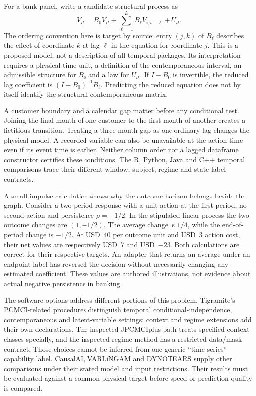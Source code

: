 For a bank panel, write a candidate structural process as
\[
 V_{it}=B_0V_{it}+\sum_{\ell=1}^{L}B_\ell V_{i,t-\ell}+U_{it}.
\]
The ordering convention here is target by source: entry $(j,k)$ of $B_\ell$
describes the effect of coordinate $k$ at lag $\ell$ in the equation for
coordinate $j$. This is a proposed model, not a description of all temporal
packages. Its interpretation requires a physical time unit, a definition of
the contemporaneous interval, an admissible structure for $B_0$ and a law
for $U_{it}$. If $I-B_0$ is invertible, the reduced lag coefficient is
$(I-B_0)^{-1}B_\ell$. Predicting the reduced equation does not by itself
identify the structural contemporaneous matrix.

A customer boundary and a calendar gap matter before any conditional test.
Joining the final month of one customer to the first month of another creates
a fictitious transition. Treating a three-month gap as one ordinary lag
changes the physical model. A recorded variable can also be unavailable at
the action time even if its event time is earlier. Neither column order nor a
lagged dataframe constructor certifies these conditions. The R, Python, Java
and C++ temporal comparisons trace their different window, subject, regime
and state-label contracts. \citep{exec14_pt_contract,exec16_ct_pcalg,exec16_ct_agrum,exec16_ct_sdbn}

A small impulse calculation shows why the outcome horizon belongs beside the
graph. Consider a two-period response with a unit action at the first period,
no second action and persistence $\rho=-1/2$. In the stipulated linear process
the two outcome changes are $(1,-1/2)$. The average change is $1/4$, while
the end-of-period change is $-1/2$. At USD~40 per outcome unit and USD~3
action cost, their net values are respectively USD~7 and USD~$-23$.
Both calculations are correct for their respective targets. An adapter that
returns an average under an endpoint label has reversed the decision without
necessarily changing any estimated coefficient. These values are authored
illustrations, not evidence about actual negative persistence in banking.
\citep{exec16_s2_exact}

The software options address different portions of this problem. Tigramite's
PCMCI-related procedures distinguish temporal conditional-independence,
contemporaneous and latent-variable settings; context and regime extensions
add their own declarations. The inspected JPCMCIplus path treats specified
context classes specially, and the inspected regime method has a restricted
data/mask contract. Those choices cannot be inferred from one generic
``time series'' capability label. CausalAI, VARLiNGAM and DYNOTEARS supply
other comparisons under their stated model and input restrictions. Their
results must be evaluated against a common physical target before speed or
prediction quality is compared. \citep{exec14_pt_tigramite,exec14_pt_causalai,exec14_pt_causalnex,exec13_pydisc_lingam}

